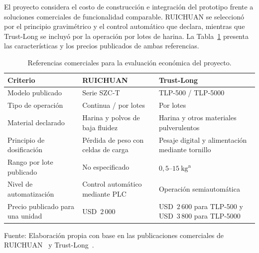 El proyecto considera el costo de construcción e integración del prototipo
frente a soluciones comerciales de funcionalidad comparable. RUICHUAN se
seleccionó por el principio gravimétrico y el control automático que declara,
mientras que Trust-Long se incluyó por la operación por lotes de harina. La
Tabla~\ref{tab:comparativa_economica} presenta las características y los
precios publicados de ambas referencias.

\begin{table}[H]
    \centering
    \caption{Referencias comerciales para la evaluación económica del proyecto.}
    \label{tab:comparativa_economica}
    \footnotesize
    \setlength{\tabcolsep}{4pt}
    \renewcommand{\arraystretch}{1.35}

    \begin{tabularx}{\textwidth}{
        >{\raggedright\arraybackslash}p{}
        >{\raggedright\arraybackslash}X
        >{\raggedright\arraybackslash}X}
        \toprule[1pt]

        \textbf{Criterio} &
        \textbf{RUICHUAN} &
        \textbf{Trust-Long} \\
        \midrule[1pt]

        Modelo publicado &
        Serie SZC-T &
        TLP-500 / TLP-5000 \\
        \midrule

        Tipo de operación &
        Continua / por lotes &
        Por lotes \\
        \midrule

        Material declarado &
        Harina y polvos de baja fluidez &
        Harina y otros materiales pulverulentos \\
        \midrule

        Principio de dosificación &
        Pérdida de peso con celdas de carga &
        Pesaje digital y alimentación mediante tornillo \\
        \midrule

        Rango por lote publicado &
        No especificado &
        $0{,}5$--$15\ \mathrm{kg}$\textsuperscript{a} \\
        \midrule

        Nivel de automatización &
        Control automático mediante PLC &
        Operación semiautomática \\
        \midrule

        Precio publicado para una unidad &
        USD~$2\,000$ &
        USD~$2\,600$ para TLP-500 y
        USD~$3\,800$ para TLP-5000 \\
        \bottomrule[1pt]
    \end{tabularx}

    \vspace{0.5em}

    {\footnotesize
    Fuente: Elaboración propia con base en las publicaciones comerciales de
    RUICHUAN~\parencite{UnidadDosificadoraGravimetrica} y
    Trust-Long~\parencite{MaquinaLlenadoPolvo}.}
\end{table}

